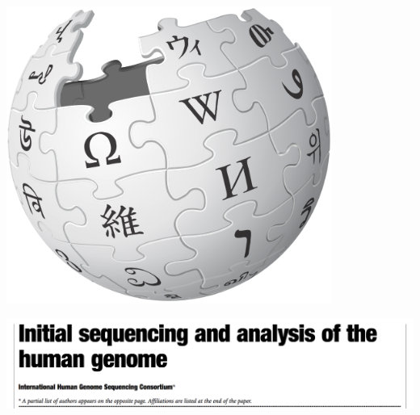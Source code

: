 \documentclass{beamer}
\begin{document}
\begin{frame}

\begin{center}
\includegraphics[width=0.8\textwidth]{figures/wikipedia_logo}
\end{center}

\end{frame}
\begin{frame}

\begin{center}
\includegraphics[width=\textwidth]{figures/lander_initial_2001_title}
\end{center}

\end{frame}
\end{document}
